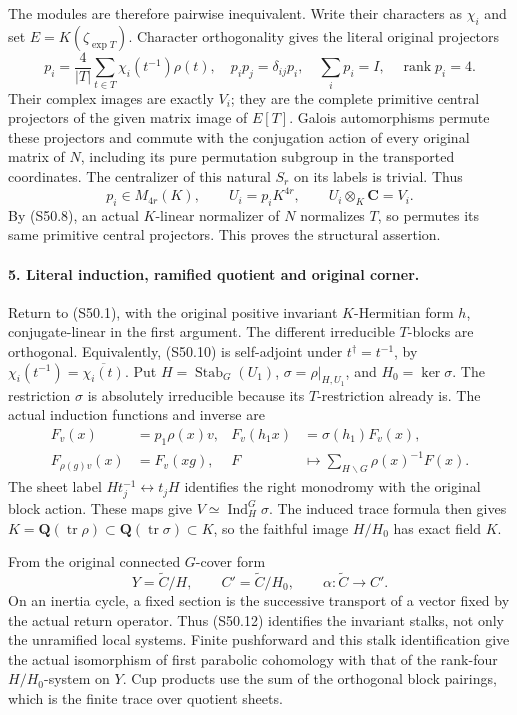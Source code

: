 The modules are therefore pairwise inequivalent. Write their
characters as \(\chi_i\) and set \(E=K(\zeta_{\exp T})\).
Character orthogonality gives the literal original projectors
\[
 p_i=\frac4{|T|}\sum_{t\in T}\chi_i(t^{-1})\rho(t),
 \quad p_ip_j=\delta_{ij}p_i,\quad\sum_i p_i=I,
 \quad\operatorname{rank}p_i=4.                            \tag{S50.10}
\]
Their complex images are exactly \(V_i\); they are the
complete primitive central projectors of the given matrix
image of \(E[T]\). Galois automorphisms permute these
projectors and commute with the conjugation action of every
original matrix of \(N\), including its pure permutation
subgroup in the transported coordinates. The centralizer of
this natural \(S_r\) on its labels is trivial. Thus
\[
                  p_i\in M_{4r}(K),\qquad U_i=p_iK^{4r},
        \qquad U_i\otimes_K\mathbf C=V_i.                 \tag{S50.11}
\]
By (S50.8), an actual \(K\)-linear normalizer of \(N\)
normalizes \(T\), so permutes its same primitive central
projectors. This proves the structural assertion.

\paragraph{5. Literal induction, ramified quotient and original corner.}
Return to (S50.1), with the original positive invariant
\(K\)-Hermitian form \(h\), conjugate-linear in the
first argument. The different irreducible \(T\)-blocks
are orthogonal. Equivalently, (S50.10) is self-adjoint under
\(t^\dagger=t^{-1}\), by
\(\chi_i(t^{-1})=\overline{\chi_i(t)}\).
Put \(H=\operatorname{Stab}_G(U_1)\),
\(\sigma=\rho|_{H,U_1}\), and \(H_0=\ker\sigma\).
The restriction \(\sigma\) is absolutely irreducible
because its \(T\)-restriction already is. The actual
induction functions and inverse are
\[
\begin{aligned}
 F_v(x)&=p_1\rho(x)v,&F_v(h_1x)&=\sigma(h_1)F_v(x),\\
 F_{\rho(g)v}(x)&=F_v(xg),&
 F&\longmapsto\sum_{H\backslash G}\rho(x)^{-1}F(x).
\end{aligned}                                                   \tag{S50.12}
\]
The sheet label \(Ht_j^{-1}\leftrightarrow t_jH\)
identifies the right monodromy with the original block action.
These maps give \(V\simeq\operatorname{Ind}_H^G\sigma\).
The induced trace formula then gives
\(K=\mathbf Q(\operatorname{tr}\rho)\subset
\mathbf Q(\operatorname{tr}\sigma)\subset K\), so the
faithful image \(H/H_0\) has exact field \(K\).

From the original connected \(G\)-cover form
\[
 Y=\widetilde C/H,\qquad C'=\widetilde C/H_0,
                 \qquad\alpha:\widetilde C\longrightarrow C'.
                                                               \tag{S50.13}
\]
On an inertia cycle, a fixed section is the successive
transport of a vector fixed by the actual return operator.
Thus (S50.12) identifies the invariant stalks, not only the
unramified local systems. Finite pushforward and this stalk
identification give the actual isomorphism of first parabolic
cohomology with that of the rank-four \(H/H_0\)-system on
\(Y\). Cup products use the sum of the orthogonal block
pairings, which is the finite trace over quotient sheets.

